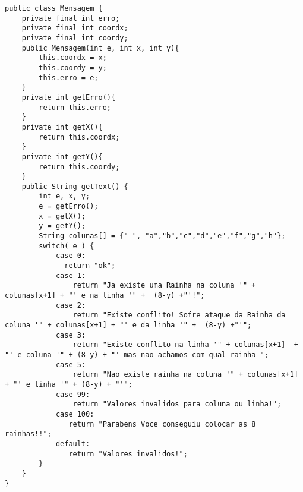 \begin{lstlisting}
public class Mensagem {
    private final int erro;
    private final int coordx;
    private final int coordy;   
    public Mensagem(int e, int x, int y){
        this.coordx = x;
        this.coordy = y;
        this.erro = e;  
    }
    private int getErro(){
        return this.erro;
    }
    private int getX(){
        return this.coordx;
    }
    private int getY(){
        return this.coordy;
    }
    public String getText() {
        int e, x, y;
        e = getErro();
        x = getX();
        y = getY();
        String colunas[] = {"-", "a","b","c","d","e","f","g","h"};
        switch( e ) {
            case 0: 
              return "ok";
            case 1:
                return "Ja existe uma Rainha na coluna '" + colunas[x+1] + "' e na linha '" +  (8-y) +"'!";                  
            case 2:
                return "Existe conflito! Sofre ataque da Rainha da coluna '" + colunas[x+1] + "' e da linha '" +  (8-y) +"'";                  
            case 3: 
                return "Existe conflito na linha '" + colunas[x+1]  + "' e coluna '" + (8-y) + "' mas nao achamos com qual rainha ";                  
            case 5: 
                return "Nao existe rainha na coluna '" + colunas[x+1] + "' e linha '" + (8-y) + "'";                  
            case 99: 
                return "Valores invalidos para coluna ou linha!"; 
            case 100: 
               return "Parabens Voce conseguiu colocar as 8 rainhas!!"; 
            default:
               return "Valores invalidos!";
        }         
    }   
}
\end{lstlisting}
